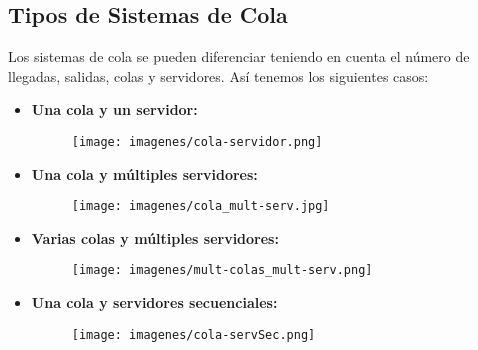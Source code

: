 \documentclass{article}
\begin{document}
\subsection{Tipos de Sistemas de Cola}
Los sistemas de cola se pueden diferenciar teniendo en cuenta el número de llegadas, salidas, colas y servidores. Así tenemos los siguientes casos:
\begin{itemize}
    \item \textbf{Una cola y un servidor:}
    \begin{figure}[H]
        \centering
        \texttt{[image: imagenes/cola-servidor.png]}
    \end{figure}

    \item \textbf{Una cola y múltiples servidores:}
    \begin{figure}[H]
        \centering
        \texttt{[image: imagenes/cola\_mult-serv.jpg]}
    \end{figure}

    \item \textbf{Varias colas y múltiples servidores:}
    \begin{figure}[H]
        \centering
        \texttt{[image: imagenes/mult-colas\_mult-serv.png]}
    \end{figure}

    \item \textbf{Una cola y servidores secuenciales:}
    \begin{figure}[H]
        \centering
        \texttt{[image: imagenes/cola-servSec.png]}
    \end{figure}
\end{itemize}
\end{document}
